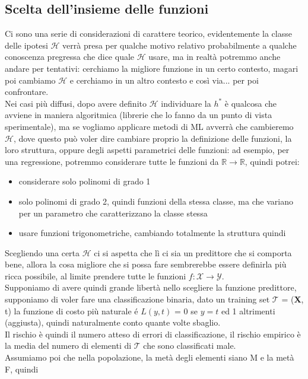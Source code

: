 \documentclass[12pt, oneside]{extbook}
\begin{document}
\subsection{Scelta dell'insieme delle funzioni} 
Ci sono una serie di considerazioni di carattere teorico, evidentemente la classe delle ipotesi $\mathscr{H}$ verrà presa per qualche motivo relativo probabilmente a qualche conoscenza pregressa che dice quale $\mathscr{H}$ usare, ma in realtà potremmo anche andare per tentativi: cerchiamo la migliore funzione in un certo contesto, magari poi cambiamo $\mathscr{H}$ e cerchiamo in un altro contesto e così via... per poi confrontare.\\Nei casi più diffusi, dopo avere definito $\mathscr{H}$  individuare la $h^*$ è qualcosa che avviene in maniera algoritmica (librerie che lo fanno da un punto di vista sperimentale), ma se vogliamo applicare metodi di ML avverrà che cambieremo $\mathscr{H}$, dove questo può voler dire cambiare proprio la definizione delle funzioni, la loro struttura, oppure degli aspetti parametrici delle funzioni: ad esempio, per una regressione, potremmo considerare tutte le funzioni da $\mathbb{R} \rightarrow \mathbb{R}$, quindi potrei:
\begin{itemize}
	\item considerare solo polinomi di grado 1
	\item solo polinomi di grado 2, quindi funzioni della stessa classe, ma che variano per un parametro che caratterizzano la classe stessa
	\item usare funzioni trigonometriche, cambiando totalmente la struttura quindi
\end{itemize}
Scegliendo una certa $\mathscr{H}$ ci si aspetta che lì ci sia un predittore che si comporta bene, allora la cosa migliore che si possa fare sembrerebbe essere definirla più ricca possibile, al limite prendere tutte le funzioni $f: \mathscr{X} \rightarrow \mathscr{Y}$.\\Supponiamo di avere quindi grande libertà nello scegliere la funzione predittore, supponiamo di voler fare una classificazione binaria, dato un training set $\mathscr{T}$ = (\textbf{X}, t) la funzione di costo più naturale é $L(y,t)$ = 0 se $y=t$ ed 1 altrimenti (aggiusta), quindi naturalmente conto quante volte sbaglio.\\Il rischio è quindi il numero atteso di errori di classificazione, il rischio empirico è la media del numero di elementi di $\mathscr{T}$ che sono classificati male.\\Assumiamo poi che nella popolazione, la metà degli elementi siano M e la metà F, quindi 
\end{document}
